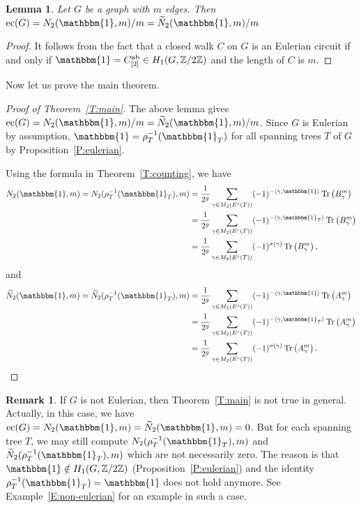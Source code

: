 \documentclass[11pt]{amsart}
\theoremstyle{plain}
\newtheorem{lemma}[theorem]{Lemma}
\theoremstyle{definition}
\newtheorem{remark}[theorem]{Remark}
\newcommand{\mbbZ}{{\mathbb Z}}
\DeclareMathOperator{\ab}{\operatorname{ab}}
\DeclareMathOperator{\ec}{\operatorname{ec}}
\DeclareMathOperator{\trace}{\operatorname{Tr}}
\numberwithin{equation}{section}
\begin{document}
\begin{lemma} \label{L:eulerian}
Let $G$ be a graph with $m$ edges. Then $\ec(G)=N_2(\mathbbm{1},m)/m = \widetilde{N}_2(\mathbbm{1},m)/m$
\end{lemma}

\begin{proof}
It follows from the fact that a closed walk $C$ on $G$ is an Eulerian circuit if and only if $\mathbbm{1}=C^{\ab}_{[2]}\in H_1(G,\mbbZ/2\mbbZ)$ and the length of $C$ is $m$.
\end{proof}

Now let us prove the main theorem.

\begin{proof}[Proof of Theorem~\ref{T:main}]
The above lemma gives $\ec(G)=N_2(\mathbbm{1},m)/m = \widetilde{N}_2(\mathbbm{1},m)/m$. Since $G$ is Eulerian by assumption,  $\mathbbm{1}=\rho_T^{-1}(\mathbbm{1}_T)$ for all spanning trees $T$ of $G$ by Proposition~\ref{P:eulerian}. 

Using the formula in Theorem~\ref{T:counting}, we have
\begin{align*}
N_2(\mathbbm{1},m) = N_2(\rho_T^{-1}(\mathbbm{1}_T),m) &= \frac{1}{2^g}\sum_{\gamma\in M_2(E^c(T))}(-1)^{-\langle\gamma, \mathbbm{1}\rangle}\trace\left(B_\gamma^m\right) \\
&= \frac{1}{2^g}\sum_{\gamma\in M_2(E^c(T))}(-1)^{-\langle\gamma, \mathbbm{1}_T\rangle}\trace\left(B_\gamma^m\right) \\
&=\frac{1}{2^g}\sum_{\gamma\in M_2(E^c(T))}(-1)^{\sigma(\gamma)}\trace\left(B_\gamma^m\right),
\end{align*} 
and 
\begin{align*}
\widetilde{N}_2(\mathbbm{1},m)= \widetilde{N}_2(\rho_T^{-1}(\mathbbm{1}_T),m)  &= \frac{1}{2^g}\sum_{\gamma\in M_2(E^c(T))}(-1)^{-\langle\gamma, \mathbbm{1}\rangle}\trace\left(A_\gamma^m\right) \\
&= \frac{1}{2^g}\sum_{\gamma\in M_2(E^c(T))}(-1)^{-\langle\gamma, \mathbbm{1}_T\rangle}\trace\left(A_\gamma^m\right) \\
&=\frac{1}{2^g}\sum_{\gamma\in M_2(E^c(T))}(-1)^{\sigma(\gamma)}\trace\left(A_\gamma^m\right).
\end{align*} 


\end{proof}

\begin{remark} \label{R:nonEulerian}
If $G$ is not Eulerian, then Theorem~\ref{T:main} is not true in general. Actually, in this case, we have $\ec(G)=N_2(\mathbbm{1},m)=\widetilde{N}_2(\mathbbm{1},m)=0$. But for each spanning tree $T$, we may still compute $N_2(\rho_T^{-1}(\mathbbm{1}_T),m) $ and $\widetilde{N}_2(\rho_T^{-1}(\mathbbm{1}_T),m) $ which are not necessarily zero. The reason is that $\mathbbm{1}\notin H_1(G,\mbbZ/2\mbbZ)$ (Proposition~\ref{P:eulerian}) and the identity $\rho_T^{-1}(\mathbbm{1}_T)=\mathbbm{1}$ does not hold anymore. See Example~\ref{E:non-eulerian} for an example in such a case. 
\end{remark}
\end{document}
